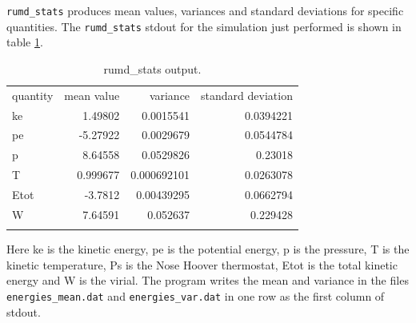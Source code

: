 \verb=rumd_stats= produces mean values, variances and standard
deviations for specific quantities. The \verb=rumd_stats= stdout for
the simulation just performed is shown in table \ref{stat}.  
\begin{table}[!ht]
  \begin{center}
    \begin{tabular}{ l r r r }
      quantity & mean value &  variance & standard deviation \\
      ke     &  1.49802	  &  0.0015541	 &  0.0394221 \\
      pe     & -5.27922	  &  0.0029679	 &  0.0544784 \\
      p	     &  8.64558	  &  0.0529826	 &  0.23018 \\
      T	     &  0.999677  &  0.000692101 &  0.0263078 \\
      Etot   & -3.7812	  &  0.00439295	 &  0.0662794 \\
      W	     &  7.64591	  &  0.052637	 &  0.229428 \\
      \label{stats}
    \end{tabular}
    \caption{rumd\_stats output.}\label{stat}
  \end{center}
\end{table}

Here ke is the kinetic energy, pe is the potential energy, p is the
pressure, T is the kinetic temperature, Ps is the Nose Hoover
thermostat, Etot is the total kinetic energy and W is the virial. The
program writes the mean and variance in the files
\verb=energies_mean.dat= and \verb=energies_var.dat= in one row as the
first column of stdout. 

